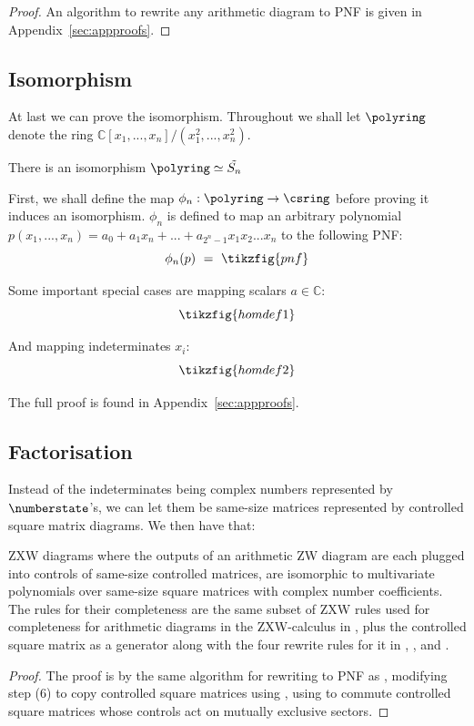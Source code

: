 \begin{proof}
    An algorithm to rewrite any arithmetic diagram to PNF is given in Appendix~\ref{sec:appproofs}.
\end{proof}

\subsection{Isomorphism}

At last we can prove the isomorphism. Throughout we shall let $\polyring$ denote the ring $\mathbb{C}[x_1, ..., x_{n}]/(x_1^2, ..., x_{n}^2)$.


\begin{thm}\label{thm:iso}
    There is an isomorphism $\polyring \simeq \tilde{S_n}$
\end{thm}

First, we shall define the map $\phi_n: \polyring \to \csring$ before proving it induces an isomorphism. $\phi_n$ is defined to map an arbitrary polynomial $p(x_1, ..., x_n) = a_0 + a_1x_n + ... + a_{2^n-1}x_1x_2...x_n$ to the following PNF:
    \begin{equation}
        \phi_n(p) ~=~ \tikzfig{pnf}
    \end{equation}

Some important special cases are mapping scalars $a \in \mathbb{C}$:
 \begin{equation}
        \tikzfig{homdef1}
\end{equation}

And mapping indeterminates $x_i$:
    \begin{equation}
        \tikzfig{homdef2}
    \end{equation}

The full proof is found in Appendix~\ref{sec:appproofs}.

\subsection{Factorisation}
Instead of the indeterminates being complex numbers represented by $\numberstate$'s, we can let them be same-size matrices represented by controlled square matrix diagrams.
We then have that:
\begin{thm}
    ZXW diagrams where the outputs of an arithmetic ZW diagram are each plugged into controls of same-size controlled matrices, are isomorphic to multivariate polynomials over same-size square matrices with complex number coefficients.
    The rules for their completeness are the same subset of ZXW rules used for completeness for arithmetic diagrams in the ZXW-calculus in , plus the controlled square matrix as a generator along with the four rewrite rules for it in , , and .
\end{thm}
\begin{proof}
    The proof is by the same algorithm for rewriting to PNF as , modifying step (6) to copy controlled square matrices using , using  to commute controlled square matrices whose controls act on mutually exclusive sectors.
\end{proof}

